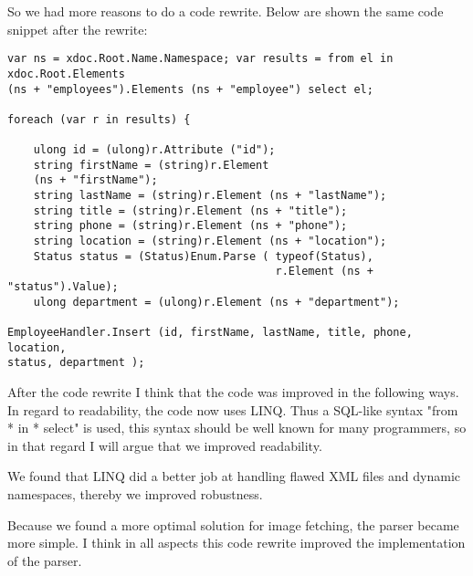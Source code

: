     So we had more reasons to do a code rewrite. 
    Below are shown the same code snippet after the rewrite:
    \begin{lstlisting}
var ns = xdoc.Root.Name.Namespace; var results = from el in xdoc.Root.Elements
(ns + "employees").Elements (ns + "employee") select el;

foreach (var r in results) {

    ulong id = (ulong)r.Attribute ("id"); 
    string firstName = (string)r.Element
    (ns + "firstName");
    string lastName = (string)r.Element (ns + "lastName");
    string title = (string)r.Element (ns + "title"); 
    string phone = (string)r.Element (ns + "phone"); 
    string location = (string)r.Element (ns + "location"); 
    Status status = (Status)Enum.Parse ( typeof(Status), 
                                         r.Element (ns + "status").Value);
    ulong department = (ulong)r.Element (ns + "department");

EmployeeHandler.Insert (id, firstName, lastName, title, phone, location,
status, department );
    \end{lstlisting}
    After the code rewrite I think that the code was improved in the following
    ways. In regard to readability, the code now uses LINQ. Thus a SQL-like
    syntax "from * in * select" is used, this syntax should be well known for
    many programmers, so in that regard I will argue that we improved
    readability.
    
    We found that LINQ did a better job at handling flawed XML files and
    dynamic namespaces, thereby we improved robustness.
    
    Because we found a more optimal solution for image fetching, the parser
    became more simple. I think in all aspects this code rewrite improved the
    implementation of the parser.
